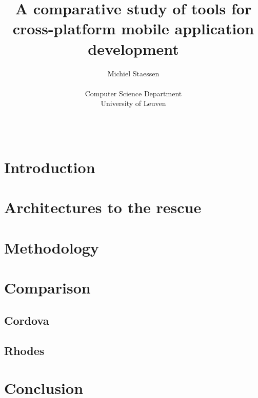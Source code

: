 \documentclass[a4paper, conference]{IEEEconf}
\begin{document}
\title{A comparative study of tools for cross-platform mobile application development}
\author{Michiel Staessen \\
    \begin{affiliation}
       Computer Science Department\\
       University of Leuven\\
    \end{affiliation} \\
}
\maketitle

\section{Introduction}

\section{Architectures to the rescue}

\section{Methodology}

\section{Comparison}

\subsection{Cordova}

\subsection{Rhodes}

\section{Conclusion}
\end{document}
